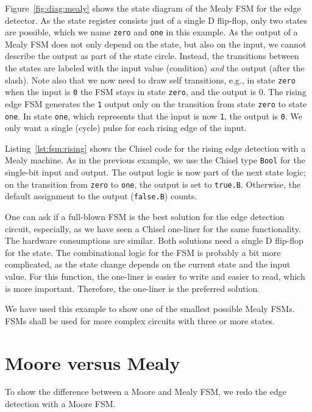 \documentclass[%
    10pt,
    headinclude, footinclude=false,
    openright, %
    notitlepage,
    cleardoublepage=empty,
    headsepline,
    numbers=noenddot,
    bibliography=totoc, index=totoc,
    ]{scrbook}
\newcommand{\code}[1]{{\lstinline[basicstyle=\small\ttfamily]{#1}}}
\begin{document}
Figure~\ref{fig:diag:mealy} shows the state diagram of the Mealy FSM for the
edge detector. As the state register consists just of a single D flip-flop,
only two states are possible, which we name \code{zero} and \code{one} in this
example.
As the output of a Mealy FSM does not only depend on the state, but also
on the input, we cannot describe the output as part of the state circle.
Instead, the transitions between the states are labeled with the input
value (condition) \emph{and} the output (after the slash).
Note also that we now need to draw self transitions, e.g., in state \code{zero} when
the input is \code{0} the FSM stays in state \code{zero}, and the output is {0}.
The rising edge FSM generates the \code{1} output only on the transition
from state \code{zero} to state \code{one}. In state \code{one}, which represents
that the input is now \code{1}, the output is \code{0}. We only want a single (cycle)
pulse for each rising edge of the input.


Listing~\ref{lst:fsm:rising} shows the Chisel code for the rising edge detection
with a Mealy machine.
As in the previous example, we use the Chisel type \code{Bool} for the
single-bit input and output.
The output logic is now part of the next state logic; on the transition from
\code{zero} to \code{one}, the output is set to \code{true.B}. Otherwise,
the default assignment to the output (\code{false.B}) counts.

One can ask if a full-blown FSM is the best solution for the edge detection circuit,
especially, as we have seen a Chisel one-liner for the same functionality.
The hardware consumptions are similar. Both solutions need a single D flip-flop
for the state. The combinational logic for the FSM is probably a bit more complicated, as
the state change depends on the current state and the input value.
For this function, the one-liner is easier to write and easier to read,
which is more important. Therefore, the one-liner is the preferred solution.

We have used this example to show one of the smallest possible Mealy FSMs.
FSMs shall be used for more complex circuits with three or more states.

\section{Moore versus Mealy}

To show the difference between a Moore and Mealy FSM, we redo the edge
detection with a Moore FSM.
\end{document}
